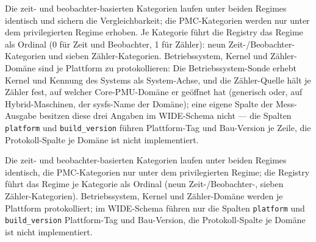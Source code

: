 \begin{nurlang}
Die zeit- und beobachter-basierten Kategorien laufen unter beiden Regimes identisch und sichern die
Vergleichbarkeit; die PMC-Kategorien werden nur unter dem privilegierten Regime erhoben. Je Kategorie
führt die Registry das Regime als Ordinal (0 für Zeit und Beobachter, 1 für Zähler): neun
Zeit-/Beobachter-Kategorien und sieben Zähler-Kategorien. Betriebssystem, Kernel und Zähler-Domäne sind
je Plattform zu protokollieren: Die Betriebssystem-Sonde erhebt Kernel und Kennung des Systems als
System-Achse, und die Zähler-Quelle hält je Zähler fest, auf welcher Core-PMU-Domäne er geöffnet hat
(generisch oder, auf Hybrid-Maschinen, der sysfs-Name der Domäne); eine eigene Spalte der Mess-Ausgabe
besitzen diese drei Angaben im WIDE-Schema nicht --- die Spalten \texttt{platform} und
\texttt{build\_version} führen Plattform-Tag und Bau-Version je Zeile, die Protokoll-Spalte je
Domäne ist nicht implementiert.
\end{nurlang}
\begin{nurkurz}
Die zeit- und beobachter-basierten Kategorien laufen unter beiden Regimes identisch, die PMC-Kategorien
nur unter dem privilegierten Regime; die Registry führt das Regime je Kategorie als Ordinal (neun
Zeit-/Beobachter-, sieben Zähler-Kategorien). Betriebssystem, Kernel und Zähler-Domäne werden je Plattform
protokolliert; im WIDE-Schema führen nur die Spalten
\texttt{platform} und \texttt{build\_version} Plattform-Tag und Bau-Version, die Protokoll-Spalte je
Domäne ist nicht implementiert.
\end{nurkurz}


